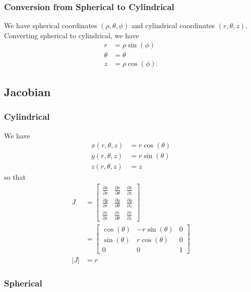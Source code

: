 \subsubsection{Conversion from Spherical to Cylindrical}

We have spherical coordinates \((\rho, \theta, \phi)\) and cylindrical coordinates \((r, \theta, z)\). Converting spherical to cylindrical, we have
\begin{align*}
  r & = \rho \sin(\phi) \\
  \theta & = \theta \\
  z & = \rho \cos(\phi).
\end{align*}

\newpage

\subsection{Jacobian}

\subsubsection{Cylindrical}

We have
\begin{align*}
  x(r, \theta, z) & = r \cos(\theta) \\
  y(r, \theta, z) & = r \sin(\theta) \\
  z(r, \theta, z) & = z
\end{align*}
so that
\begin{align*}
  J &= \begin{bmatrix} \frac{\partial x}{\partial r} & \frac{\partial x}{\partial \theta} & \frac{\partial x}{\partial z} \\ \frac{\partial y}{\partial r} & \frac{\partial y}{\partial \theta} & \frac{\partial y}{\partial z} \\ \frac{\partial z}{\partial r} & \frac{\partial z}{\partial \theta} & \frac{\partial z}{\partial z} \end{bmatrix} \\
    &= \begin{bmatrix} \cos(\theta) & -r \sin(\theta) & 0 \\ \sin(\theta) & r \cos(\theta) & 0 \\ 0 & 0 & 1 \end{bmatrix} \\
  |J|  &= r
\end{align*}

\subsubsection{Spherical}

